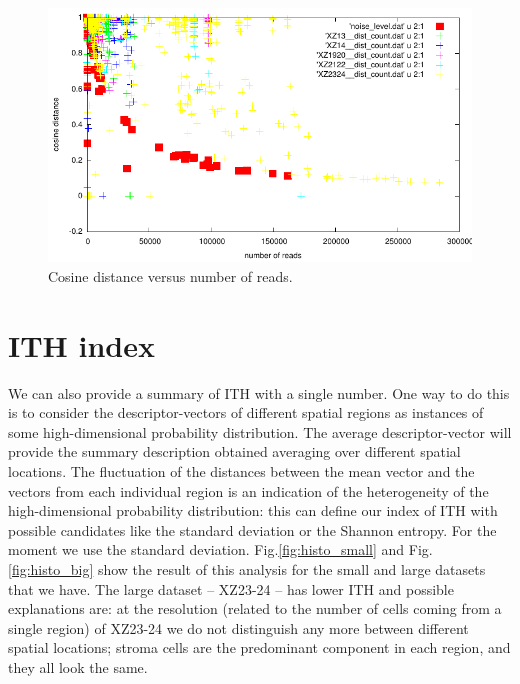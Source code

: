 \documentclass[11pt,a4paper]{article}
\begin{document}
\begin{figure}[hbtp]
\centering
\includegraphics[scale=1]{intra_tumor_heterog__q10_res100k.pdf}
\caption{Cosine distance versus number of reads.}
\label{fig:intra_tumor_heterog__q10_res100k}
\end{figure}

\section{ITH index}
We can also provide a summary of ITH with a single number. One way to do this is to consider the descriptor-vectors of  different spatial regions as instances of some high-dimensional probability distribution. The average descriptor-vector will provide the summary description obtained averaging over different spatial locations. The fluctuation of the distances between the mean vector and the vectors from each individual region is an indication of the heterogeneity of the high-dimensional probability distribution: this can define our index of ITH with possible candidates like the standard deviation or the Shannon entropy. For the moment we use the standard deviation. Fig.\ref{fig:histo_small} and Fig.\ref{fig:histo_big} show the result of this analysis for the small and large datasets that we have. The large dataset -- XZ23-24 -- has lower ITH and possible explanations are: at the resolution (related to the number of cells coming from a single region) of XZ23-24 we do not distinguish any more between different spatial locations; stroma cells are the predominant component in each region, and they all look the same. 
		
\end{document}
